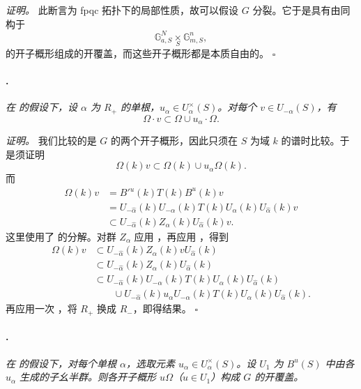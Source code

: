 \textit{证明。}
此断言为 fpqc 拓扑下的局部性质，故可以假设 \(G\) 分裂。它于是具有由同构于
\[
  \mathbb G_{a,S}^{N}\mathop{\times}\limits_S\mathbb G_{m,S}^{n},
\]
的开子概形组成的开覆盖，而这些开子概形都是本质自由的。
\hfill\(\square\)

\paragraph{.}
\textit{在  的假设下，设 \(\alpha\) 为 \(R_+\) 的单根，\(u_\alpha\in U_\alpha^\times(S)\)。对每个 \(v\in U_{-\alpha}(S)\)，有}
\[
  \Omega\cdot v\subset\Omega\cup u_\alpha\cdot\Omega.
\]

\textit{证明。}
我们比较的是 \(G\) 的两个开子概形，因此只须在 \(S\) 为域 \(k\) 的谱时比较。于是须证明
\[
  \Omega(k)v\subset\Omega(k)\cup u_\alpha\Omega(k).
\]
而
\[
\begin{aligned}
  \Omega(k)v
  &=B'{}^u(k)T(k)B^u(k)v\\
  &=U_{-\widehat\alpha}(k)U_{-\alpha}(k)T(k)
    U_\alpha(k)U_{\widehat\alpha}(k)v\\
  &\subset
    U_{-\widehat\alpha}(k)Z_\alpha(k)
    U_{\widehat\alpha}(k)v.
\end{aligned}
\]
这里使用了  的分解。对群 \(Z_\alpha\) 应用  \textup{}，再应用 ，得到
\[
\begin{aligned}
  \Omega(k)v
  &\subset
    U_{-\widehat\alpha}(k)Z_\alpha(k)v
    U_{\widehat\alpha}(k)\\
  &\subset
    U_{-\widehat\alpha}(k)Z_\alpha(k)
    U_{\widehat\alpha}(k)\\
  &\subset
    U_{-\widehat\alpha}(k)U_{-\alpha}(k)T(k)
    U_\alpha(k)U_{\widehat\alpha}(k)\\
  &\qquad\cup
    U_{-\widehat\alpha}(k)u_\alpha U_{-\alpha}(k)T(k)
    U_\alpha(k)U_{\widehat\alpha}(k).
\end{aligned}
\]
再应用一次  \textup{}，将 \(R_+\) 换成 \(R_-\)，即得结果。
\hfill\(\square\)

\paragraph{.}
\textit{在  的假设下，对每个单根 \(\alpha\)，选取元素 \(u_\alpha\in U_\alpha^\times(S)\)。设 \(U_1\) 为 \(B^u(S)\) 中由各 \(u_\alpha\) 生成的子幺半群。则各开子概形 \(u\Omega\)（\(u\in U_1\)）构成 \(G\) 的开覆盖。}

